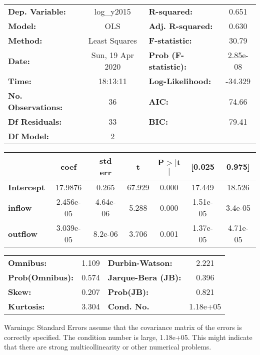 \begin{center}
\begin{tabular}{lclc}
\toprule
\textbf{Dep. Variable:}    &    log\_y2015    & \textbf{  R-squared:         } &     0.651   \\
\textbf{Model:}            &       OLS        & \textbf{  Adj. R-squared:    } &     0.630   \\
\textbf{Method:}           &  Least Squares   & \textbf{  F-statistic:       } &     30.79   \\
\textbf{Date:}             & Sun, 19 Apr 2020 & \textbf{  Prob (F-statistic):} &  2.85e-08   \\
\textbf{Time:}             &     18:13:11     & \textbf{  Log-Likelihood:    } &   -34.329   \\
\textbf{No. Observations:} &          36      & \textbf{  AIC:               } &     74.66   \\
\textbf{Df Residuals:}     &          33      & \textbf{  BIC:               } &     79.41   \\
\textbf{Df Model:}         &           2      & \textbf{                     } &             \\
\bottomrule
\end{tabular}
\begin{tabular}{lcccccc}
                   & \textbf{coef} & \textbf{std err} & \textbf{t} & \textbf{P$> |$t$|$} & \textbf{[0.025} & \textbf{0.975]}  \\
\midrule
\textbf{Intercept} &      17.9876  &        0.265     &    67.929  &         0.000        &       17.449    &       18.526     \\
\textbf{inflow}    &    2.456e-05  &     4.64e-06     &     5.288  &         0.000        &     1.51e-05    &      3.4e-05     \\
\textbf{outflow}   &    3.039e-05  &      8.2e-06     &     3.706  &         0.001        &     1.37e-05    &     4.71e-05     \\
\bottomrule
\end{tabular}
\begin{tabular}{lclc}
\textbf{Omnibus:}       &  1.109 & \textbf{  Durbin-Watson:     } &    2.221  \\
\textbf{Prob(Omnibus):} &  0.574 & \textbf{  Jarque-Bera (JB):  } &    0.396  \\
\textbf{Skew:}          &  0.207 & \textbf{  Prob(JB):          } &    0.821  \\
\textbf{Kurtosis:}      &  3.304 & \textbf{  Cond. No.          } & 1.18e+05  \\
\bottomrule
\end{tabular}
\end{center}

Warnings: \newline
 [1] Standard Errors assume that the covariance matrix of the errors is correctly specified. \newline
 [2] The condition number is large, 1.18e+05. This might indicate that there are \newline
 strong multicollinearity or other numerical problems.